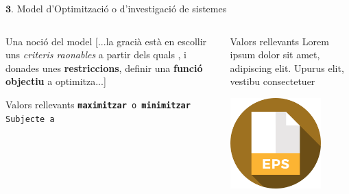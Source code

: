 \documentclass[twocolumn]{beamer}
\begin{document}
\begin{frame}{$\mathbf 3.$ Model d’Optimització o d’investigació de sistemes}
\begin{columns}[t]
\begin{column}{.5\textwidth}
	\begin{block}{Una noció del model}
		[...la gracià està en escollir uns \emph{criteris raonables}
		a partir dels quals , i donades unes \textbf{restriccions}, definir una \textbf{funció objectiu} a optimitza...]
	\end{block}

\begin{block}{Valors rellevants}
\texttt{\textbf{maximitzar} o \textbf{minimitzar}} 
\\
\texttt{Subjecte a}
\end{block}
\end{column}
\begin{column}{.5\textwidth}
	\begin{block}{Valors rellevants}
		Lorem ipsum dolor sit amet,
		adipiscing elit. Upurus elit, vestibu
		consectetuer 
	\end{block}
	\includegraphics[width=3.5cm]{eps}
\end{column}
\end{columns}
\end{frame}
\end{document}
